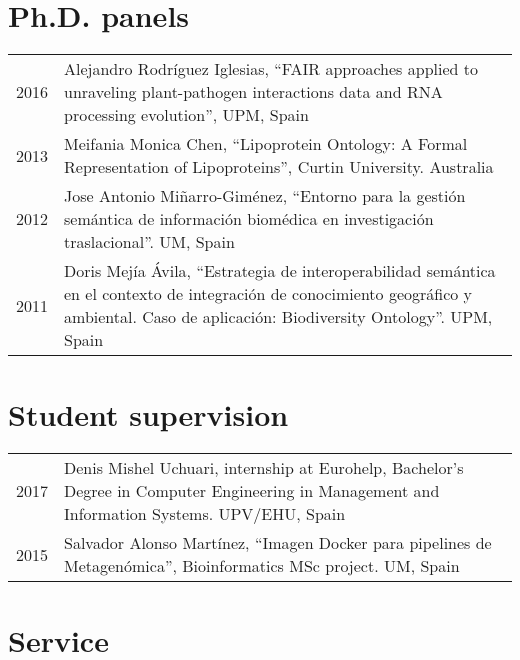 \documentclass[11pt,fullpage]{article}
\begin{document}
\section*{Ph.D. panels}

\begin{longtable}{p{0.5in}|p{5.5in}}

2016 & Alejandro Rodr\'iguez Iglesias, ``FAIR approaches applied to unraveling plant-pathogen interactions data and RNA processing evolution'', UPM, Spain \\

2013 & Meifania Monica Chen, ``Lipoprotein Ontology: A Formal Representation of Lipoproteins'', Curtin University. Australia \\

2012 & Jose Antonio Mi\~narro-Gim\'enez, ``Entorno para la gesti\'on sem\'antica de informaci\'on biom\'edica en investigaci\'on traslacional''. UM, Spain \\

2011 & Doris Mej\'ia \'Avila, ``Estrategia de interoperabilidad sem\'antica en el contexto de integraci\'on de conocimiento geogr\'afico y ambiental. Caso de aplicaci\'on: Biodiversity Ontology''. UPM, Spain \\

\end{longtable}


\section*{Student supervision}

\begin{longtable}{p{0.5in}|p{5.5in}}

2017 & Denis Mishel Uchuari, internship at Eurohelp, Bachelor's Degree in Computer Engineering in Management and Information Systems. UPV/EHU, Spain \\
2015 &  Salvador Alonso Mart\'inez, ``Imagen Docker para pipelines de Metagen\'omica'', Bioinformatics MSc project. UM, Spain \\


\end{longtable}


\section*{Service}

\end{document}
